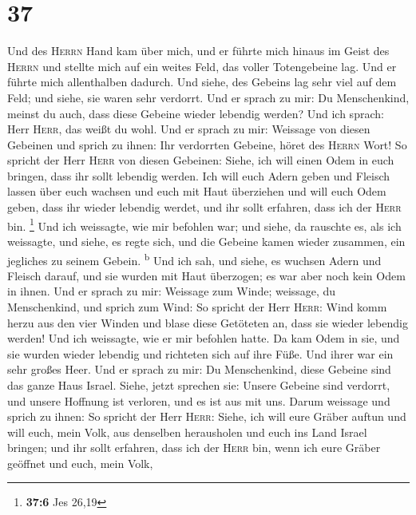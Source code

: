 \hypertarget{section-36}{%
\section{37}\label{section-36}}

 Und des \textsc{Herrn} Hand kam über mich, und er führte
mich hinaus im Geist des \textsc{Herrn} und stellte mich auf ein weites
Feld, das voller Totengebeine lag.  Und er führte mich
allenthalben dadurch. Und siehe, des Gebeins lag sehr viel auf dem Feld;
und siehe, sie waren sehr verdorrt.  Und er sprach zu mir:
Du Menschenkind, meinst du auch, dass diese Gebeine wieder lebendig
werden? Und ich sprach: Herr \textsc{Herr}, das weißt du wohl.
 Und er sprach zu mir: Weissage von diesen Gebeinen und
sprich zu ihnen: Ihr verdorrten Gebeine, höret des \textsc{Herrn} Wort!
 So spricht der Herr \textsc{Herr} von diesen Gebeinen:
Siehe, ich will einen Odem in euch bringen, dass ihr sollt lebendig
werden.  Ich will euch Adern geben und Fleisch lassen über
euch wachsen und euch mit Haut überziehen und will euch Odem geben, dass
ihr wieder lebendig werdet, und ihr sollt erfahren, dass ich der
\textsc{Herr} bin. \footnote{\textbf{37:6} Jes 26,19}  Und
ich weissagte, wie mir befohlen war; und siehe, da rauschte es, als ich
weissagte, und siehe, es regte sich, und die Gebeine kamen wieder
zusammen, ein jegliches zu seinem Gebein. \textsuperscript{b}
 Und ich sah, und siehe, es wuchsen Adern und Fleisch
darauf, und sie wurden mit Haut überzogen; es war aber noch kein Odem in
ihnen.  Und er sprach zu mir: Weissage zum Winde;
weissage, du Menschenkind, und sprich zum Wind: So spricht der Herr
\textsc{Herr}: Wind komm herzu aus den vier Winden und blase diese
Getöteten an, dass sie wieder lebendig werden!  Und ich
weissagte, wie er mir befohlen hatte. Da kam Odem in sie, und sie wurden
wieder lebendig und richteten sich auf ihre Füße. Und ihrer war ein sehr
großes Heer.  Und er sprach zu mir: Du Menschenkind,
diese Gebeine sind das ganze Haus Israel. Siehe, jetzt sprechen sie:
Unsere Gebeine sind verdorrt, und unsere Hoffnung ist verloren, und es
ist aus mit uns.  Darum weissage und sprich zu ihnen: So
spricht der Herr \textsc{Herr}: Siehe, ich will eure Gräber auftun und
will euch, mein Volk, aus denselben herausholen und euch ins Land Israel
bringen;  und ihr sollt erfahren, dass ich der
\textsc{Herr} bin, wenn ich eure Gräber geöffnet und euch, mein Volk,
